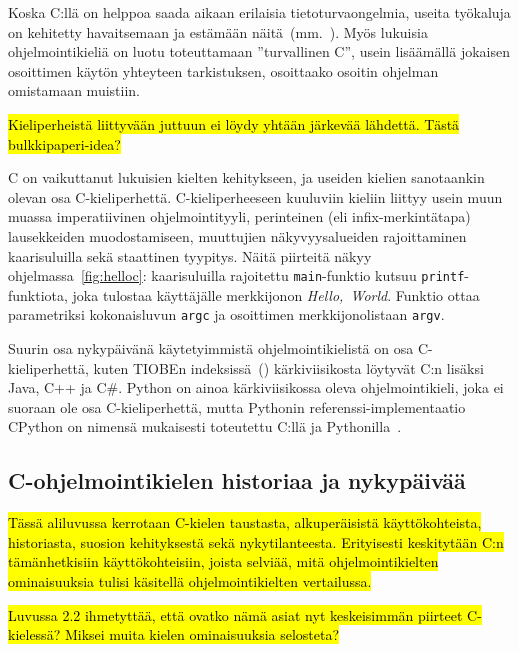Koska C:llä on helppoa saada aikaan erilaisia tietoturvaongelmia, useita
työkaluja on kehitetty havaitsemaan ja estämään
näitä~(mm.~\citet{valgrind,asan}). Myös lukuisia ohjelmointikieliä on luotu
toteuttamaan ''turvallinen C'', usein lisäämällä jokaisen osoittimen käytön
yhteyteen tarkistuksen, osoittaako osoitin ohjelman omistamaan muistiin.

\hl{Kieliperheistä liittyvään juttuun ei löydy yhtään järkevää lähdettä. Tästä
bulkkipaperi-idea?}

C on vaikuttanut lukuisien kielten kehitykseen, ja useiden kielien sanotaankin
olevan osa C-kieliperhettä. C-kieliperheeseen kuuluviin kieliin liittyy usein
muun muassa imperatiivinen ohjelmointityyli, perinteinen (eli
infix-merkintätapa) lausekkeiden muodostamiseen, muuttujien näkyvyysalueiden
rajoittaminen kaarisuluilla sekä staattinen tyypitys. Näitä piirteitä näkyy
ohjelmassa~\ref{fig:helloc}: kaarisuluilla rajoitettu \texttt{main}-funktio
kutsuu \texttt{printf}-funktiota, joka tulostaa käyttäjälle merkkijonon
\emph{Hello,~World}. Funktio ottaa parametriksi kokonaisluvun \texttt{argc} ja
osoittimen merkkijonolistaan \texttt{argv}.

Suurin osa nykypäivänä käytetyimmistä ohjelmointikielistä on osa
C-kieliperhettä, kuten TIOBEn indeksissä~(\citeyear{tiobe}) kärkiviisikosta
löytyvät C:n lisäksi Java, C++ ja C\#. Python on ainoa kärkiviisikossa oleva
ohjelmointikieli, joka ei suoraan ole osa C-kieliperhettä, mutta Pythonin
referenssi-implementaatio CPython on nimensä mukaisesti toteutettu
C:llä ja Pythonilla~\citep{cpython}.

\subsection{C-ohjelmointikielen historiaa ja nykypäivää}
\label{sec:ctaustaa}

\hl{Tässä aliluvussa kerrotaan C-kielen taustasta, alkuperäisistä
käyttökohteista, historiasta, suosion kehityksestä sekä nykytilanteesta.
Erityisesti keskitytään C:n tämänhetkisiin käyttökohteisiin, joista selviää,
mitä ohjelmointikielten ominaisuuksia tulisi käsitellä ohjelmointikielten
vertailussa.}

\hl{ Luvussa 2.2 ihmetyttää, että ovatko nämä asiat nyt keskeisimmän piirteet
C-kielessä? Miksei muita kielen ominaisuuksia selosteta? }

